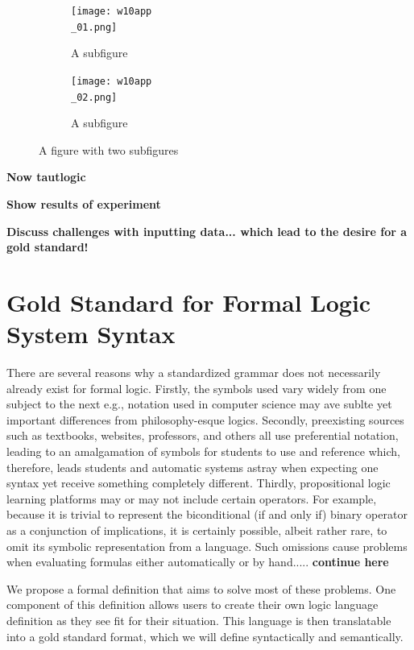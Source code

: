 \documentclass[ms]{uncgdissertationexp2}
\theoremstyle{plain}
\theoremstyle{definition}
\theoremstyle{remark}
\begin{document}
    \begin{figure}[h]
        \centering
        \begin{subfigure}{.5\textwidth}
          \centering
          \texttt{[image: w10app\\\_01.png]}
          \caption{A subfigure}
          \label{fig:sub1}
        \end{subfigure}%
        \begin{subfigure}{.5\textwidth}
          \centering
          \texttt{[image: w10app\\\_02.png]}
          \caption{A subfigure}
          \label{fig:sub2}
        \end{subfigure}
        \caption{A figure with two subfigures}
        \label{fig:test}
    \end{figure}

    \textbf{Now tautlogic}

    \textbf{Show results of experiment}

    \textbf{Discuss challenges with inputting data... which lead to the desire for a gold standard!}
    
    \section{Gold Standard for Formal Logic System Syntax}
    There are several reasons why a standardized grammar does not necessarily already exist for formal logic. Firstly, the symbols used vary widely from one subject to the next e.g., notation used in computer science may ave sublte yet important differences from philosophy-esque logics. Secondly, preexisting sources such as textbooks, websites, professors, and others all use preferential notation, leading to an amalgamation of symbols for students to use and reference which, therefore, leads students and automatic systems astray when expecting one syntax yet receive something completely different. Thirdly, propositional logic learning platforms may or may not include certain operators. For example, because it is trivial to represent the biconditional (if and only if) binary operator as a conjunction of implications, it is certainly possible, albeit rather rare, to omit its symbolic representation from a language. Such omissions cause problems when evaluating formulas either automatically or by hand..... \textbf{continue here}

    We propose a formal definition that aims to solve most of these problems. One component of this definition allows users to create their own logic language definition as they see fit for their situation. This language is then translatable into a gold standard format, which we will define syntactically and semantically.
\end{document}
